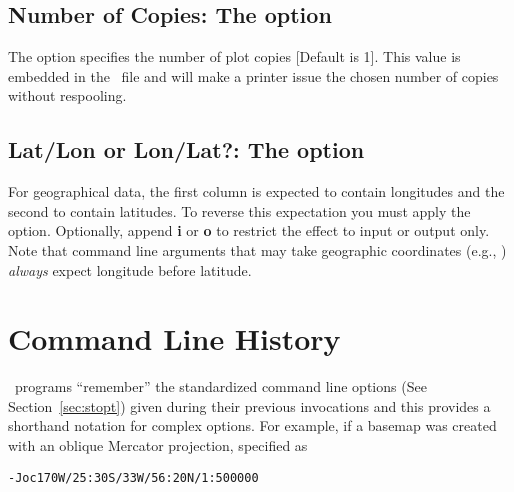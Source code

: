 \subsection{Number of Copies: The  option}

The  option specifies the number of plot copies [Default is 1].  This
value is embedded in the \PS\ file and will make a printer issue the chosen
number of copies without respooling.

\subsection{Lat/Lon or Lon/Lat?: The \Opt{:} option}

For geographical data, the first column is expected to contain longitudes
and the second to contain latitudes.  To reverse this expectation you must
apply the \Opt{:} option.  Optionally, append \textbf{i} or \textbf{o} to restrict
the effect to input or output only.  Note that command line arguments that may take
geographic coordinates (e.g., ) \emph{always} expect longitude before
latitude.

%

\section{Command Line History}

\GMT\ programs ``remember'' the standardized command line options
(See Section~\ref{sec:stopt}) given during their previous invocations
and this provides a shorthand notation for complex options.
For example, if a basemap was created with an oblique Mercator
projection, specified as

\vspace{\baselineskip} 

\texttt{-Joc170W/25:30S/33W/56:20N/1:500000} \\ 

